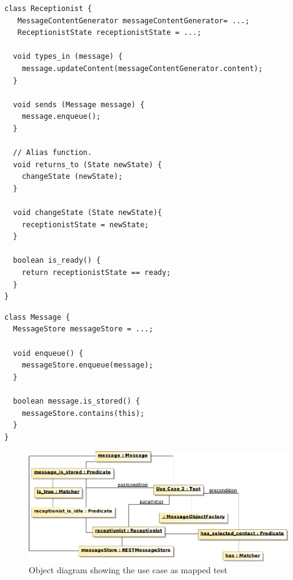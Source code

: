 \begin{lstlisting}[caption=Pseudo code representing Receptionist domain actor,label={lst:code_for_receptionist_domain_actor}]
class Receptionist {
   MessageContentGenerator messageContentGenerator= ...;
   ReceptionistState receptionistState = ...;
  
  void types_in (message) {
  	message.updateContent(messageContentGenerator.content);
  }
  
  void sends (Message message) {
    message.enqueue();
  }
  
  // Alias function.
  void returns_to (State newState) {
  	changeState (newState);
  }
  
  void changeState (State newState){
  	receptionistState = newState;
  }
  
  boolean is_ready() {
    return receptionistState == ready;
  }
}
\end{lstlisting}

\begin{lstlisting}[caption=Pseudo code representing Message domain concept,label={lst:code_for_domain_concept}]
class Message {
  MessageStore messageStore = ...;
  
  void enqueue() {
    messageStore.enqueue(message);
  }

  boolean message.is_stored() {
    messageStore.contains(this);
  }
}
\end{lstlisting}

\begin{figure}
 \includegraphics[scale=0.45]{img/uc2_test_config}
 \caption{Object diagram showing the use case as mapped test}
\end{figure}

